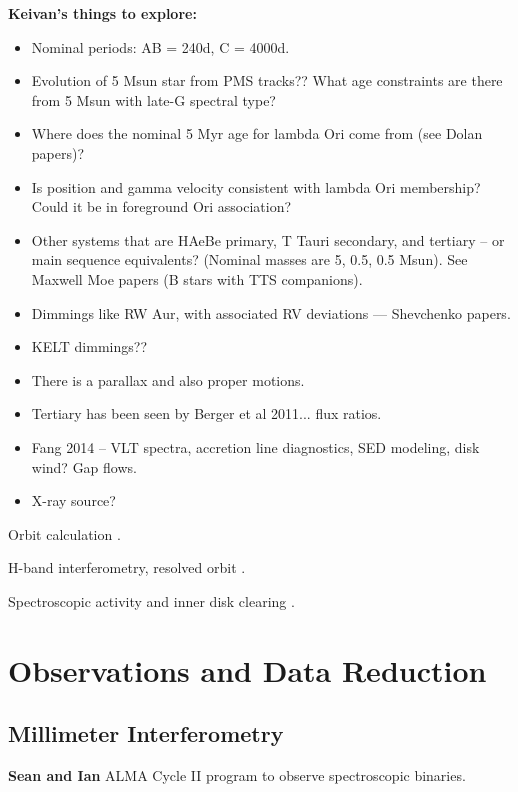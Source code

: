 \documentclass[twocolumn]{aastex6}
\newcommand{\twelve}{CO}
\newcommand{\thirteen}{${}^{13}$CO}
\newcommand{\eighteen}{C${}^{18}$O}
\begin{document}
\noindent
\textbf{Keivan's things to explore:}
\begin{itemize}
\item Nominal periods: AB = 240d, C = 4000d.
\item Evolution of 5 Msun star from PMS tracks?? What age constraints are there from 5 Msun with late-G spectral type?
\item Where does the nominal 5 Myr age for lambda Ori come from (see Dolan papers)?
\item Is position and gamma velocity consistent with lambda Ori membership? Could it be in foreground Ori association?
\item Other systems that are HAeBe primary, T Tauri secondary, and tertiary -- or main sequence equivalents? (Nominal masses are 5, 0.5, 0.5 Msun). See Maxwell Moe papers (B stars with TTS companions).
\item Dimmings like RW Aur, with associated RV deviations --- Shevchenko papers.
\item KELT dimmings??
\item There is a parallax and also proper motions.
\item Tertiary has been seen by Berger et al 2011... flux ratios.
\item Fang 2014 -- VLT spectra, accretion line diagnostics, SED modeling, disk wind? Gap flows.
\item X-ray source?
\end{itemize}

Orbit calculation \citep{mathieu91}.

H-band interferometry, resolved orbit \citep{berger11}.

Spectroscopic activity and inner disk clearing \citep{fang14}.

\section{Observations and Data Reduction}

\subsection{Millimeter Interferometry}
\textbf{Sean and Ian} ALMA Cycle II program to observe spectroscopic binaries.

\end{document}
